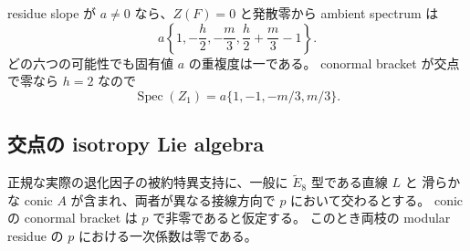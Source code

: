 residue slope が $a\ne0$ なら、$Z(F)=0$ と発散零から ambient spectrum は
\begin{equation}\label{eq:line-spectrum-node}
 a\left\{1,-\frac h2,-\frac m3,\frac h2+\frac m3-1\right\}.
\end{equation}
どの六つの可能性でも固有値 $a$ の重複度は一である。
conormal bracket が交点で零なら $h=2$ なので
\[
 \operatorname{Spec}(Z_1)=a\{1,-1,-m/3,m/3\}.
 \tag{LS2}
\]

\subsection{交点の isotropy Lie algebra}

\begin{proposition}\label{prop:line-conic-slopes}
正規な実際の退化因子の被約特異支持に、一般に $\widetilde E_8$ 型である直線 $L$ と
滑らかな conic $A$ が含まれ、両者が異なる接線方向で $p$ において交わるとする。
conic の conormal bracket は $p$ で非零であると仮定する。
このとき両枝の modular residue の $p$ における一次係数は零である。
\end{proposition}

